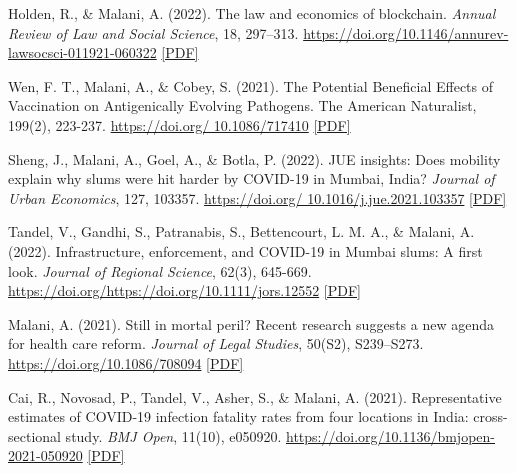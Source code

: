 \begin{tablist}
        \item[2022] \tab{}Holden, R., \& Malani, A. (2022). The law and economics of blockchain. \textit{Annual Review of Law and Social Science}, 18, 297–313. \href{https://doi.org/10.1146/annurev-lawsocsci-011921-060322}{https://doi.org/10.1146/annurev-lawsocsci-011921-060322} \href{https://github.com/anup-malani/website_personal/blob/main/publications/2022_HoldenMalani_AnnualReview_LawEconomicsBlockchain.pdf}{[PDF]}
        
        \item[2022] \tab{}Wen, F. T., Malani, A., \& Cobey, S. (2021). The Potential Beneficial Effects of Vaccination on Antigenically Evolving Pathogens. The American Naturalist, 199(2), 223-237. \href{https://doi.org/10.1086/717410}{https://doi.org/ 10.1086/717410} \href{https://github.com/anup-malani/website_personal/blob/main/publications/2022_WenMalaniCobey_AmerNaturalist_FluEvolution.pdf}{[PDF]} 

        \item[2022] \tab{}Sheng, J., Malani, A., Goel, A., \& Botla, P. (2022). JUE insights: Does mobility explain why slums were hit harder by COVID-19 in Mumbai, India? \textit{Journal of Urban Economics}, 127, 103357. \href{https://doi.org/10.1016/j.jue.2021.103357}{https://doi.org/ 10.1016/j.jue.2021.103357} \href{https://github.com/anup-malani/website_personal/blob/main/publications/2022_ShengMalaniEtAl_JUE_SlumMobilityCOVID.pdf}{[PDF]}
        
        \item[2022] \tab{}Tandel, V., Gandhi, S., Patranabis, S., Bettencourt, L. M. A., \& Malani, A. (2022). Infrastructure, enforcement, and COVID-19 in Mumbai slums: A first look. \textit{Journal of Regional Science}, 62(3), 645-669. \href{https://doi.org/https://doi.org/10.1111/jors.12552}{https://doi.org/https://doi.org/10.1111/jors.12552} \href{https://github.com/anup-malani/website_personal/blob/main/publications/2022_ShengMalaniEtAl_JUE_SlumMobilityCOVID.pdf}{[PDF]} 

        \item[2021] \tab{}Malani, A. (2021). Still in mortal peril? Recent research suggests a new agenda for health care reform. \textit{Journal of Legal Studies}, 50(S2), S239–S273. \href{https://doi.org/10.1086/708094}{https://doi.org/10.1086/708094} \href{https://github.com/anup-malani/website_personal/blob/main/publications/2021_Malani_JLS_MortalPeril.pdf}{[PDF]}
        
        \item[2021] \tab{}Cai, R., Novosad, P., Tandel, V., Asher, S., \& Malani, A. (2021). Representative estimates of COVID-19 infection fatality rates from four locations in India: cross-sectional study. \textit{BMJ Open}, 11(10), e050920. \href{https://doi.org/10.1136/bmjopen-2021-050920}{https://doi.org/10.1136/bmjopen-2021-050920} \href{https://github.com/anup-malani/website_personal/blob/main/publications/2021_Malani_JLS_MortalPeril.pdf}{[PDF]}
        

\end{tablist}
